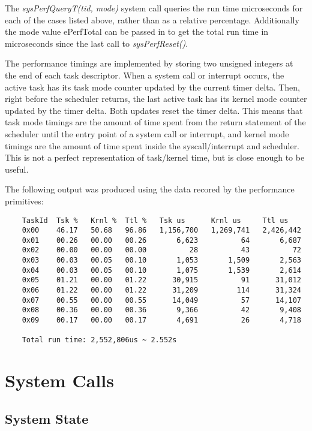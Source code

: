 \documentclass[twoside,a4paper]{refart}
\begin{document}
The \textit{sysPerfQueryT(tid, mode)} system call queries the run time microseconds for each of the cases listed above, rather than as a relative percentage. Additionally the mode value ePerfTotal can be passed in to get the total run time in microseconds since the last call to \textit{sysPerfReset()}.

The performance timings are implemented by storing two unsigned integers at the end of each task descriptor. When a system call or interrupt occurs, the active task has its task mode counter updated by the current timer delta. Then, right before the scheduler returns, the last active task has its kernel mode counter updated by the timer delta. Both updates reset the timer delta. This means that task mode timings are the amount of time spent from the return statement of the scheduler until the entry point of a system call or interrupt, and kernel mode timings are the amount of time spent inside the syscall/interrupt and scheduler. This is not a perfect representation of task/kernel time, but is close enough to be useful. 

The following output was produced using the data recored by the performance primitives:
\begin{verbatim}
    TaskId  Tsk %   Krnl %  Ttl %   Tsk us      Krnl us     Ttl us
    0x00    46.17   50.68   96.86   1,156,700   1,269,741   2,426,442
    0x01    00.26   00.00   00.26       6,623          64       6,687
    0x02    00.00   00.00   00.00          28          43          72
    0x03    00.03   00.05   00.10       1,053       1,509       2,563
    0x04    00.03   00.05   00.10       1,075       1,539       2,614
    0x05    01.21   00.00   01.22      30,915          91      31,012
    0x06    01.22   00.00   01.22      31,209         114      31,324
    0x07    00.55   00.00   00.55      14,049          57      14,107
    0x08    00.36   00.00   00.36       9,366          42       9,408
    0x09    00.17   00.00   00.17       4,691          26       4,718

    Total run time: 2,552,806us ~ 2.552s
\end{verbatim}

\section{System Calls}
\subsection{System State}
\end{document}
